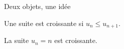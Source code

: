 \begin{slide}{Deux objets, une idée}
\begin{definition}
  Une suite est croissante si $u_n \le u_{n+1}$.
\end{definition}
\pause
\begin{example}
  La suite $u_n = n$ est croissante.
\end{example}
\end{slide}
